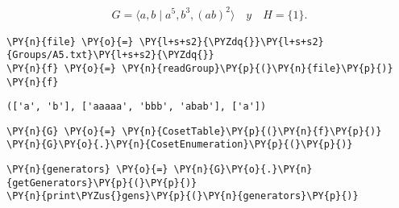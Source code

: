 \iffalse
\newpage 
\begin{enumerate}


\begin{align*}
    G = \langle a,b \mid a^5, b^3, (ab)^2 \rangle \quad y \quad H=\{ 1 \}.
\end{align*}


\begin{tcolorbox}[breakable, size=fbox, boxrule=1pt, pad at break*=1mm,colback=cellbackground, colframe=cellborder]
\begin{Verbatim}[commandchars=\\\{\}]
\PY{n}{file} \PY{o}{=} \PY{l+s+s2}{\PYZdq{}}\PY{l+s+s2}{Groups/A5.txt}\PY{l+s+s2}{\PYZdq{}}
\PY{n}{f} \PY{o}{=} \PY{n}{readGroup}\PY{p}{(}\PY{n}{file}\PY{p}{)}
\PY{n}{f}
\end{Verbatim}
\end{tcolorbox}

            \begin{tcolorbox}[breakable, size=fbox, boxrule=.5pt, pad at break*=1mm, opacityfill=0]
\begin{Verbatim}[commandchars=\\\{\}]
(['a', 'b'], ['aaaaa', 'bbb', 'abab'], ['a'])
\end{Verbatim}
\end{tcolorbox}
        
    \begin{tcolorbox}[breakable, size=fbox, boxrule=1pt, pad at break*=1mm,colback=cellbackground, colframe=cellborder]
\begin{Verbatim}[commandchars=\\\{\}]
\PY{n}{G} \PY{o}{=} \PY{n}{CosetTable}\PY{p}{(}\PY{n}{f}\PY{p}{)}
\PY{n}{G}\PY{o}{.}\PY{n}{CosetEnumeration}\PY{p}{(}\PY{p}{)}
\end{Verbatim}
\end{tcolorbox}

    \begin{tcolorbox}[breakable, size=fbox, boxrule=1pt, pad at break*=1mm,colback=cellbackground, colframe=cellborder]
\begin{Verbatim}[commandchars=\\\{\}]
\PY{n}{generators} \PY{o}{=} \PY{n}{G}\PY{o}{.}\PY{n}{getGenerators}\PY{p}{(}\PY{p}{)}
\PY{n}{print\PYZus{}gens}\PY{p}{(}\PY{n}{generators}\PY{p}{)}
\end{Verbatim}
\end{tcolorbox}


\end{enumerate}
